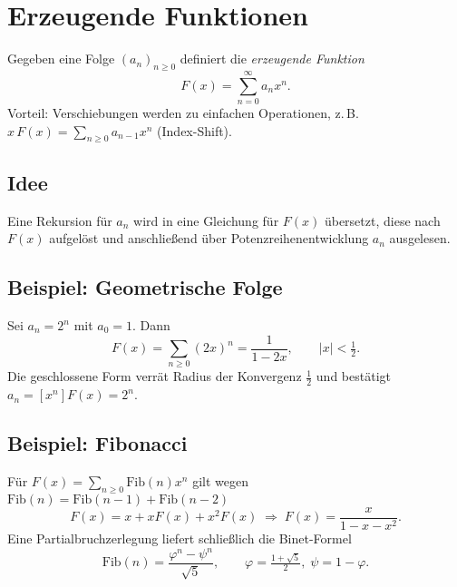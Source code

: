 \section{Erzeugende Funktionen}
Gegeben eine Folge $(a_n)_{n\ge0}$ definiert die
\emph{erzeugende Funktion}
\[F(x)=\sum_{n=0}^{\infty} a_n x^{n}.\]
Vorteil: Verschiebungen werden zu einfachen Operationen, z.\,B.\
$x\,F(x)=\sum_{n\ge0} a_{n-1}x^{n}$ (Index-Shift).

\subsection*{Idee}
Eine Rekursion für $a_n$ wird in eine Gleichung für $F(x)$ übersetzt, diese nach
$F(x)$ aufgelöst und anschließend über Potenzreihenentwicklung $a_n$
ausgelesen.

\subsection*{Beispiel: Geometrische Folge}
Sei $a_n=2^n$ mit $a_0=1$. Dann
\[F(x)=\sum_{n\ge0} (2x)^n=\frac{1}{1-2x},\qquad |x|<\tfrac{1}{2}.\]
Die geschlossene Form verrät Radius der Konvergenz $\tfrac12$ und bestätigt
$a_n=[x^{n}]F(x)=2^{n}$.

\subsection*{Beispiel: Fibonacci}
Für $F(x)=\sum_{n\ge0} \text{Fib}(n) x^n$ gilt wegen $\text{Fib}(n)=\text{Fib}(n-1)+\text{Fib}(n-2)$
\[F(x)=x + xF(x) + x^{2}F(x) \;\Longrightarrow\; F(x)=\frac{x}{1 - x - x^{2}}.\]
Eine Partialbruchzerlegung liefert schließlich die Binet-Formel
\[\text{Fib}(n)=\frac{\varphi^{n}-\psi^{n}}{\sqrt{5}},\qquad
  \varphi=\tfrac{1+\sqrt{5}}{2},\;
  \psi=1-\varphi.\]
